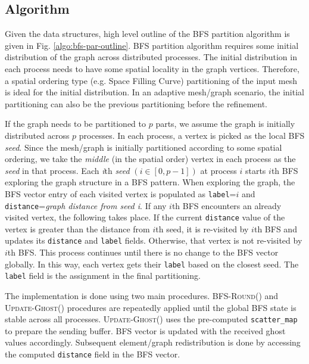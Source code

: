 \documentclass[conference]{IEEEtran}
\begin{document}
\subsection{Algorithm}
Given the data structures, high level outline of the BFS partition algorithm is given in Fig. \ref{algo:bfs-par-outline}. BFS partition algorithm requires some initial distribution of the graph across distributed processes. The initial distribution in each process needs to have some spatial locality in the graph vertices. Therefore, a spatial ordering type (e.g. Space Filling Curve) partitioning of the input mesh is ideal for the initial distribution. In an adaptive mesh/graph scenario, the initial partitioning can also be the previous partitioning before the refinement. 
\par
If the graph needs to be partitioned to $p$ parts, we assume the graph is initially distributed across $p$ processes. In each process, a vertex is picked as the local BFS \emph{seed}. Since the mesh/graph is initially partitioned according to some spatial ordering, we take the \emph{middle} (in the spatial order) vertex in each process as the \emph{seed} in that process. Each \emph{i}th \emph{seed} $(i \in [0, p-1])$ at process $i$ starts $i$th BFS exploring the graph structure in a BFS pattern. When exploring the graph, the BFS vector entry of each visited vertex is populated as \verb|label|=$i$ and \verb|distance|=\emph{graph distance from seed i}. If any $i$th BFS encounters an already visited vertex, the following takes place. If the current \verb|distance| value of the vertex is greater than the distance from $i$th seed, it is re-visited by $i$th BFS and updates its \verb|distance| and \verb|label| fields. Otherwise, that vertex is not re-visited by $i$th BFS. This process continues until there is no change to the BFS vector globally. In this way, each vertex gets their \verb|label| based on the closest seed. The \verb|label| field is the assignment in the final partitioning.
\par
The implementation is done using two main procedures. \textsc{BFS-Round()} and \textsc{Update-Ghost()} procedures are repeatedly applied until the global BFS state is stable across all processes. \textsc{Update-Ghost()} uses the pre-computed \verb|scatter_map| to prepare the sending buffer. BFS vector is updated with the received ghost values accordingly. Subsequent element/graph redistribution is done by accessing the computed \verb|distance| field in the BFS vector.
\end{document}
